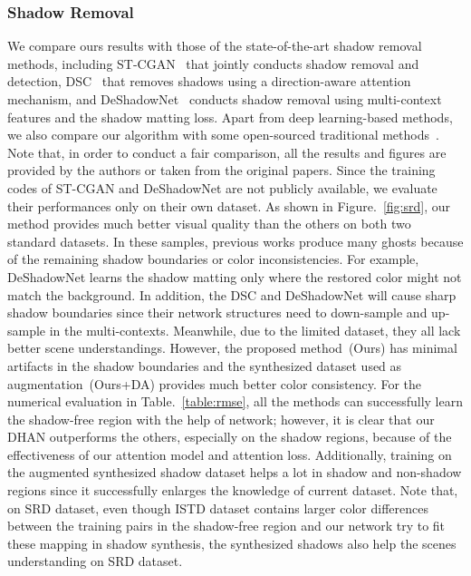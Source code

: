 \documentclass[letterpaper]{article} \usepackage{aaai20}  \usepackage{times}  \usepackage{helvet} \usepackage{courier}  \usepackage[hyphens]{url}  \urlstyle{rm} \def\UrlFont{\rm}  \usepackage{graphicx}  \frenchspacing  \setlength{\pdfpagewidth}{8.5in}  \setlength{\pdfpageheight}{11in}  \usepackage{amssymb}
\begin{document}
\subsubsection{Shadow Removal}
We compare ours results with those of the state-of-the-art shadow removal methods, including ST-CGAN~\cite{wang2018stacked} that jointly conducts shadow removal and detection, DSC~\cite{Hu:2018wd} that removes shadows using a direction-aware attention mechanism, and DeShadowNet~\cite{qu2017deshadownet} conducts shadow removal using multi-context features and the shadow matting loss. Apart from deep learning-based methods, we also compare our algorithm with some open-sourced traditional methods~\cite{Guo:2013tt,gong2014interactive,yang2012shadow}. Note that, in order to conduct a fair comparison, all the results and figures are provided by the authors or taken from the original papers. Since the training codes of ST-CGAN and DeShadowNet are not publicly available, we evaluate their performances only on their own dataset. As shown in Figure.~\ref{fig:srd}, our method provides much better visual quality than the others on both two standard datasets. In these samples, previous works produce many ghosts because of the remaining shadow boundaries or color inconsistencies. For example, DeShadowNet learns the shadow matting only where the restored color might not match the background. In addition, the DSC and DeShadowNet will cause sharp shadow boundaries since their network structures need to down-sample and up-sample in the multi-contexts. Meanwhile, due to the limited dataset, they all lack better scene understandings. However, the proposed method~(Ours) has minimal artifacts in the shadow boundaries and the synthesized dataset used as augmentation~(Ours+DA) provides much better color consistency. For the numerical evaluation in Table.~\ref{table:rmse}, all the methods can successfully learn the shadow-free region with the help of network; however, it is clear that our DHAN outperforms the others, especially on the shadow regions, because of the effectiveness of our attention model and attention loss. Additionally, training on the augmented synthesized shadow dataset helps a lot in shadow and non-shadow regions since it successfully enlarges the knowledge of current dataset. Note that, on SRD dataset,
even though ISTD dataset contains larger color differences between the training pairs in the shadow-free region and our network try to fit these mapping in shadow synthesis, the synthesized shadows also help the scenes understanding on SRD dataset. 
\end{document}
